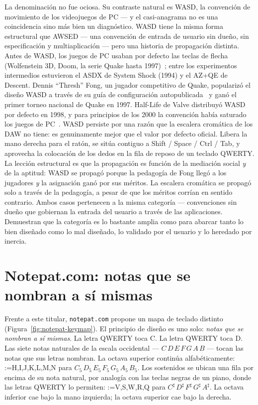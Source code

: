 \documentclass[10pt,letterpaper,twocolumn]{article}
\makeatletter
\DeclareRobustCommand{\key}[1]{\tikz[baseline=(k.base)]{%
 \node[fill=keystroke, rounded corners=1.3pt, inner xsep=2.4pt,
    inner ysep=1.9pt, anchor=base, yshift=-1.2pt] at (0,0)
  {\footnotesize\ttfamily\bfseries\vphantom{A}\phantom{#1}};
 \node[draw=keystroke, line width=0.4pt, fill=keyfill,
    rounded corners=1.3pt, inner xsep=2.4pt, inner ysep=1.9pt,
    anchor=base] (k) at (0,0)
  {\footnotesize\ttfamily\bfseries\vphantom{A}#1};}}
\DeclareRobustCommand{\keys}[1]{{\def\sep{}\@for\kk:=#1\do{\sep\key{\kk}\def\sep{\,}}}}
\makeatother
\begin{document}
La denominación no fue ociosa. Su contraste natural es WASD, la convención de movimiento de los videojuegos de PC --- y el casi-anagrama no es una coincidencia sino más bien un diagnóstico. WASD tiene la misma forma estructural que AWSED --- una convención de entrada de usuario sin dueño, sin especificación y multiaplicación --- pero una historia de propagación distinta. Antes de WASD, los juegos de PC usaban por defecto las teclas de flecha (Wolfenstein 3D, Doom, la serie Quake hasta 1997)~\citep{wikipedia_arrow_keys}; entre los experimentos intermedios estuvieron el ASDX de System Shock (1994) y el AZ+QE de Descent. Dennis ``Thresh'' Fong, un jugador competitivo de Quake, popularizó el diseño WASD a través de su guía de configuración autopublicada~\citep{thresh_quake_bible} y ganó el primer torneo nacional de Quake en 1997. Half-Life de Valve distribuyó WASD por defecto en 1998, y para principios de los 2000 la convención había saturado los juegos de PC~\citep{fenlon2016wasd}. WASD persiste por una razón que la escalera cromática de los DAW no tiene: es genuinamente mejor que el valor por defecto oficial. Libera la mano derecha para el ratón, se sitúa contiguo a Shift / Space / Ctrl / Tab, y aprovecha la colocación de los dedos en la fila de reposo de un teclado QWERTY. La lección estructural es que la propagación es función de la mediación social \emph{y} de la aptitud: WASD se propagó porque la pedagogía de Fong llegó a los jugadores \emph{y} la asignación ganó por sus méritos. La escalera cromática se propagó solo a través de la pedagogía, a pesar de que los méritos corrían en sentido contrario. Ambos casos pertenecen a la misma categoría --- convenciones sin dueño que gobiernan la entrada del usuario a través de las aplicaciones. Demuestran que la categoría es lo bastante amplia como para abarcar tanto lo bien diseñado como lo mal diseñado, lo validado por el usuario y lo heredado por inercia.

\section{Notepat.com: notas que se nombran a sí mismas}
\label{sec:notepat}

Frente a este titular, \texttt{notepat.com} propone un mapa de teclado distinto (Figura~\ref{fig:notepat-keymap}). El principio de diseño es uno solo: \emph{notas que se nombran a sí mismas}. La letra QWERTY \key{C} toca C. La letra QWERTY \key{D} toca D. Las siete notas naturales de la escala occidental --- $C\,D\,E\,F\,G\,A\,B$ --- tocan las notas que sus letras nombran. La octava superior continúa alfabéticamente: \keys{H,I,J,K,L,M,N} para $C_5\,D_5\,E_5\,F_5\,G_5\,A_5\,B_5$. Los sostenidos se ubican una fila por encima de su nota natural, por analogía con las teclas negras de un piano, donde las letras QWERTY lo permiten: \keys{V,S,W,R,Q} para $C^\sharp\,D^\sharp\,F^\sharp\,G^\sharp\,A^\sharp$. La octava inferior cae bajo la mano izquierda; la octava superior cae bajo la derecha.
\end{document}
